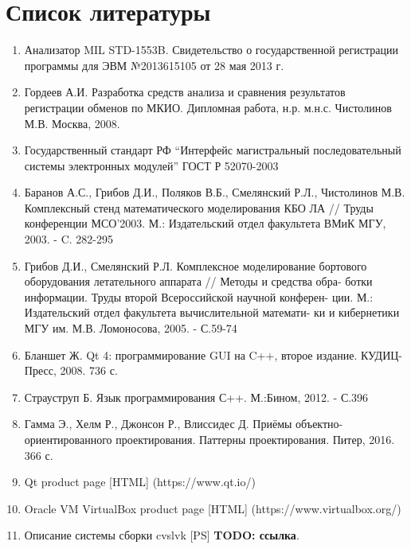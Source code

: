 \section*{Список литературы}

\begin{enumerate}
 \sloppy
 \item \label{opermon_reg} Анализатор MIL STD-1553B. Свидетельство о 
государственной регистрации программы для ЭВМ №2013615105 от 28 мая 2013 г.
 \item \label{gordeev_diploma} Гордеев А.И. Разработка средств анализа и 
сравнения результатов регистрации обменов по МКИО. Дипломная работа, н.р. 
м.н.с. Чистолинов М.В. Москва, 2008.
 \item \label{gost_r_52070-2003} Государственный стандарт РФ ``Интерфейс 
магистральный последовательный системы электронных модулей'' ГОСТ Р 52070-2003
 \item \label{stand} Баранов А.С., Грибов Д.И., Поляков В.Б., Смелянский Р.Л., 
Чистолинов М.В. Комплексный стенд математического моделирования
КБО ЛА // Труды конференции МСО'2003. М.: Издательский отдел
факультета ВМиК МГУ, 2003. - C. 282-295
 \item \label{stand2} Грибов Д.И., Смелянский Р.Л. Комплексное моделирование 
бортового оборудования летательного аппарата // Методы и средства обра-
ботки информации. Труды второй Всероссийской научной конферен-
ции. М.: Издательский отдел факультета вычислительной математи-
ки и кибернетики МГУ им. М.В. Ломоносова, 2005. - С.59-74 
 \item \label{blanshet_qt4} Бланшет Ж. Qt 4: программирование GUI на C++, 
второе издание. КУДИЦ-Пресс, 2008. 736 с.
 \item \label{straustrup} Страуструп Б. Язык программирования С++. М.:Бином, 
2012. - С.396
 \item \label{gof} Гамма Э., Хелм Р., Джонсон Р., Влиссидес Д. Приёмы 
объектно-ориентированного проектирования. Паттерны проектирования. Питер, 2016. 
366 с.
 \item \label{qt_ref} Qt product page [HTML] (https://www.qt.io/)
 \item \label{virtualbox} Oracle VM VirtualBox product page [HTML] 
(https://www.virtualbox.org/)
 \item \label{cvslvk} Описание системы сборки cvslvk [PS] \textbf{TODO: ссылка}.
\end{enumerate}
